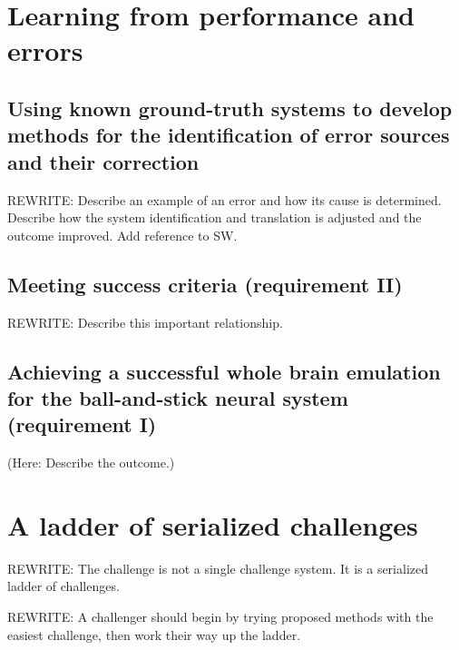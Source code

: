 \documentclass{ldr-article}
\begin{document}

\section{Learning from performance and errors}

\subsection{Using known ground-truth systems to develop methods for the identification of error sources and their correction}

\alert{REWRITE:} Describe an example of an error and how its cause is determined. Describe how the system identification and translation is adjusted and the outcome improved. Add reference to SW.

\subsection{Meeting success criteria (requirement II)}

\alert{REWRITE:} Describe this important relationship.

\subsection{Achieving a successful whole brain emulation for the ball-and-stick neural system (requirement I)}

(Here: Describe the outcome.)


\section{A ladder of serialized challenges}

\alert{REWRITE:} The challenge is not a single challenge system. It is a serialized ladder of challenges.

\alert{REWRITE:} A challenger should begin by trying proposed methods with the easiest challenge, then work their way up the ladder.
\end{document}
